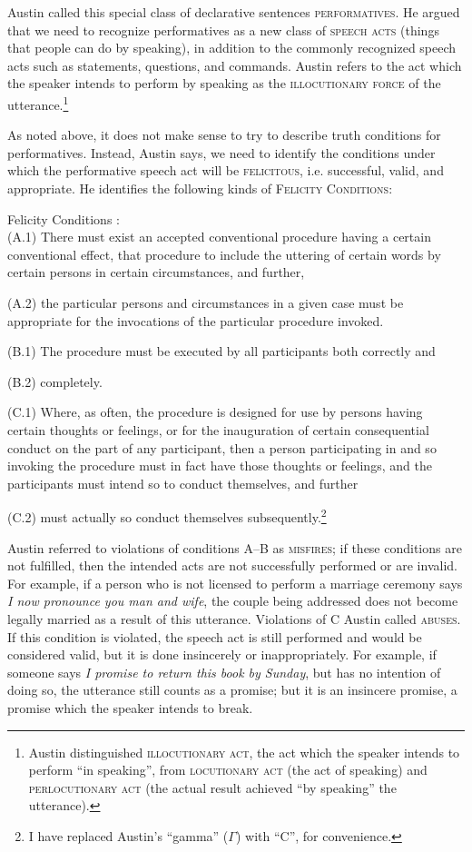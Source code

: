 Austin called this special class of declarative sentences \textsc{performatives}. He argued that we need to recognize performatives as a new class of \textsc{speech acts} (things that people can do by speaking), in addition to the commonly recognized speech acts such as statements, questions, and commands. Austin refers to the act which the speaker intends to perform by speaking as the \textsc{illocutionary force} of the utterance.\footnote{Austin distinguished \textsc{illocutionary act,} the act which the speaker intends to perform “in speaking”, from \textsc{locutionary act} (the act of speaking) and \textsc{perlocutionary act} (the actual result achieved “by speaking” the utterance).}



As noted above, it does not make sense to try to describe truth conditions for performatives. Instead, Austin says, we need to identify the conditions under which the performative speech act will be \textsc{felicitous}, i.e. successful, valid, and appropriate. He identifies the following kinds of \textsc{Felicity Conditions}:


\ea \label{ex:10.4}
{Felicity Conditions} \citep[14--15]{Austin1962}:\\
(A.1) There must exist an accepted conventional procedure having a certain conventional effect, that procedure to include the uttering of certain words by certain persons in certain circumstances, and further,

(A.2) the particular persons and circumstances in a given case must be appropriate for the invocations of the particular procedure invoked.

(B.1) The procedure must be executed by all participants both correctly and

(B.2) completely.

(C.1) Where, as often, the procedure is designed for use by persons having certain thoughts or feelings, or for the inauguration of certain consequential conduct on the part of any participant, then a person participating in and so invoking the procedure must in fact have those thoughts or feelings, and the participants must intend so to conduct themselves, and further

(C.2) must actually so conduct themselves subsequently.\footnote{I have replaced Austin’s “gamma” ($\Gamma $) with “C”, for convenience.}
\z

Austin referred to violations of conditions A–B as \textsc{misfires}; if these conditions are not fulfilled, then the intended acts are not successfully performed or are invalid. For example, if a person who is not licensed to perform a marriage ceremony says \textit{I now pronounce you man and wife}, the couple being addressed does not become legally married as a result of this utterance. Violations of C Austin called \textsc{abuses}. If this condition is violated, the speech act is still performed and would be considered valid, but it is done insincerely or inappropriately. For example, if someone says \textit{I promise to return this book by Sunday}, but has no intention of doing so, the utterance still counts as a promise; but it is an insincere promise, a promise which the speaker intends to break.


